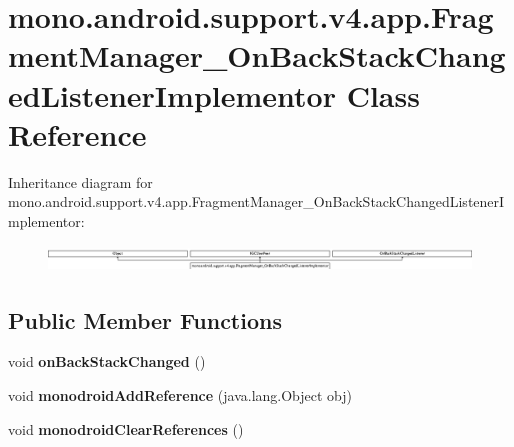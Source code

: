 \hypertarget{classmono_1_1android_1_1support_1_1v4_1_1app_1_1FragmentManager__OnBackStackChangedListenerImplementor}{}\section{mono.\+android.\+support.\+v4.\+app.\+Fragment\+Manager\+\_\+\+On\+Back\+Stack\+Changed\+Listener\+Implementor Class Reference}
\label{classmono_1_1android_1_1support_1_1v4_1_1app_1_1FragmentManager__OnBackStackChangedListenerImplementor}
Inheritance diagram for mono.\+android.\+support.\+v4.\+app.\+Fragment\+Manager\+\_\+\+On\+Back\+Stack\+Changed\+Listener\+Implementor\+:\begin{figure}[H]
\begin{center}
\leavevmode
\includegraphics[height=0.691358cm]{classmono_1_1android_1_1support_1_1v4_1_1app_1_1FragmentManager__OnBackStackChangedListenerImplementor}
\end{center}
\end{figure}
\subsection*{Public Member Functions}
\begin{DoxyCompactItemize}
\item 
\mbox{\label{classmono_1_1android_1_1support_1_1v4_1_1app_1_1FragmentManager__OnBackStackChangedListenerImplementor_aac1b73d05317d86e387f0387b87775df}} 
void {\bfseries on\+Back\+Stack\+Changed} ()
\item 
\mbox{\label{classmono_1_1android_1_1support_1_1v4_1_1app_1_1FragmentManager__OnBackStackChangedListenerImplementor_a685912956810c558e72f6494db349d6e}} 
void {\bfseries monodroid\+Add\+Reference} (java.\+lang.\+Object obj)
\item 
\mbox{\label{classmono_1_1android_1_1support_1_1v4_1_1app_1_1FragmentManager__OnBackStackChangedListenerImplementor_a4272051b3b8101262d9ec7d0aedcc515}} 
void {\bfseries monodroid\+Clear\+References} ()
\end{DoxyCompactItemize}
